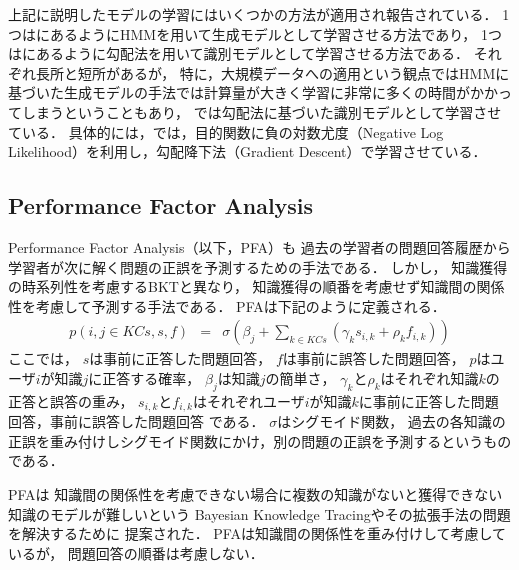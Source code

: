 上記に説明したモデルの学習にはいくつかの方法が適用され報告されている．
1つは\cite{corbett1994knowledge}にあるようにHMMを用いて生成モデルとして学習させる方法であり，
1つは\cite{yudelson2013individualized}にあるように勾配法を用いて識別モデルとして学習させる方法である．
それぞれ長所と短所があるが，
特に，大規模データへの適用という観点ではHMMに基づいた生成モデルの手法では計算量が大きく学習に非常に多くの時間がかかってしまうということもあり，
\cite{yudelson2013individualized}では勾配法に基づいた識別モデルとして学習させている．
具体的には，\cite{yudelson2013individualized}では，目的関数に負の対数尤度（Negative Log Likelihood）を利用し，勾配降下法（Gradient Descent）で学習させている．



\subsection{Performance Factor Analysis}
Performance Factor Analysis\cite{pavlik2009performance}（以下，PFA）も
過去の学習者の問題回答履歴から学習者が次に解く問題の正誤を予測するための手法である．
しかし，
知識獲得の時系列性を考慮するBKTと異なり，
知識獲得の順番を考慮せず知識間の関係性を考慮して予測する手法である．
PFAは下記のように定義される．
\begin{eqnarray}
	p(i, j \in KCs, s, f) & = & \sigma( \beta _j + \sum_{k \in KCs}(\gamma_k s_{i, k} + \rho _k f_{i, k}) )
\end{eqnarray}
ここでは，
$s$は事前に正答した問題回答，
$f$は事前に誤答した問題回答，
$p$はユーザ$i$が知識$j$に正答する確率，
$\beta_j$は知識$j$の簡単さ，
$\gamma_k$と$\rho_k$はそれぞれ知識$k$の正答と誤答の重み，
$s_{i, k}$と$f_{i, k}$はそれぞれユーザ$i$が知識$k$に事前に正答した問題回答，事前に誤答した問題回答
である．
$\sigma$はシグモイド関数，
過去の各知識の正誤を重み付けしシグモイド関数にかけ，別の問題の正誤を予測するというものである．

PFAは
知識間の関係性を考慮できない場合に複数の知識がないと獲得できない知識のモデルが難しいという
Bayesian Knowledge Tracingやその拡張手法の問題を解決するために
提案された．
PFAは知識間の関係性を重み付けして考慮しているが，
問題回答の順番は考慮しない．


